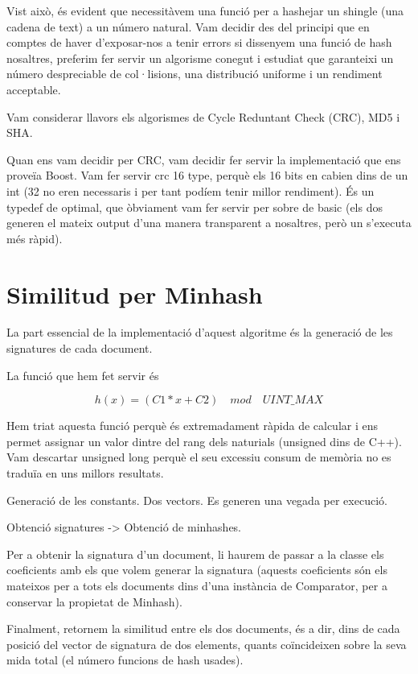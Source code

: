 \documentclass[catalan, 12pt]{report}
\begin{document}
Vist això, és evident que necessitàvem una funció per a hashejar un shingle (una cadena de text) a un número natural. Vam decidir des del principi que en comptes de haver d'exposar-nos a tenir errors si dissenyem una funció de hash nosaltres, preferim fer servir un algorisme conegut i estudiat que garanteixi un número despreciable de col·lisions, una distribució uniforme i un rendiment acceptable.

Vam considerar llavors els algorismes de Cycle Reduntant Check (CRC), MD5 i SHA.

Quan ens vam decidir per CRC, vam decidir fer servir la implementació que ens proveïa Boost. Vam fer servir crc 16 type, perquè els 16 bits en cabien dins de un int (32 no eren necessaris i per tant podíem tenir millor rendiment). És un typedef de optimal, que òbviament vam fer servir per sobre de basic (els dos generen el mateix output d'una manera transparent a nosaltres, però un s'executa més ràpid).


\section{Similitud per Minhash}

La part essencial de la implementació d'aquest algoritme és la generació de les signatures de cada document.

La funció que hem fet servir és

\[h(x) = (C1 * x + C2) \quad mod \quad UINT\_MAX \]

Hem triat aquesta funció perquè és extremadament ràpida de calcular i ens permet assignar un valor dintre del rang dels naturials (unsigned dins de C++). Vam descartar unsigned long perquè el seu excessiu consum de memòria no es traduïa en uns millors resultats.

Generació de les constants. Dos vectors. Es generen una vegada per execució.

Obtenció signatures -> Obtenció de minhashes.

Per a obtenir la signatura d'un document, li haurem de passar a la classe els coeficients amb els que volem generar la signatura (aquests coeficients són els mateixos per a tots els documents dins d'una instància de Comparator, per a conservar la propietat de Minhash).

Finalment, retornem la similitud entre els dos documents, és a dir, dins de cada posició del vector de signatura de dos elements, quants coïncideixen sobre la seva mida total (el número funcions de hash usades).
\end{document}
